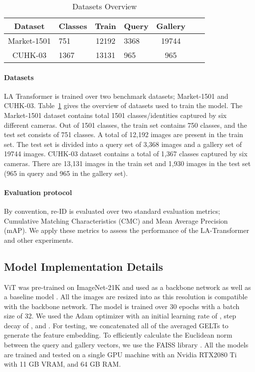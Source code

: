 \documentclass{article}
\begin{document}
\begin{table} 
  \label{DatasetOverview}
    \caption{Datasets Overview}
  \centering
  \begin{tabular}{clclclc}
    \toprule
Dataset     & Classes     & Train     & Query     & Gallery \\
    \midrule
    Market-1501 & 751       & 12192      & 3368      & 19744 \\
    CUHK-03     & 1367      & 13131     & 965       & 965  \\
    \bottomrule
  \end{tabular}
\end{table}

\paragraph{Datasets} LA Transformer is trained over two benchmark datasets; Market-1501 and CUHK-03. Table~\ref{DatasetOverview} gives the overview of datasets used to train the model. The Market-1501 dataset \citep{Market1501} contains total 1501 classes/identities captured by six different cameras.  Out of 1501 classes, the train set contains 750 classes, and the test set consists of 751 classes. A total of 12,192 images are present in the train set. The test set is divided into a query set of 3,368 images and a gallery set of 19744 images. CUHK-03 dataset \citep{cuhk03} contains a total of 1,367 classes captured by six cameras. There are 13,131 images in the train set and 1,930 images in the test set (965 in query and 965 in the gallery set).

\paragraph{Evaluation protocol} By convention, re-ID is evaluated over two standard evaluation metrics; Cumulative Matching Characteristics (CMC) and Mean Average Precision (mAP). We apply these metrics to assess the performance of the LA-Transformer and other experiments. 

\subsection{Model Implementation Details} \label{ModelImplementation}

ViT was pre-trained on ImageNet-21K and used as a backbone network as well as a baseline model \citep{ViT, imagenet21k}. All the images are resized into  as this resolution is compatible with the backbone network.  The model is trained over 30 epochs with a batch size of 32. We used the Adam optimizer with an initial learning rate of , step decay of ,   and . For testing, we concatenated all of the averaged GELTs  to generate the feature embedding. To efficiently calculate the Euclidean norm between the query and gallery vectors, we use the FAISS library \citet{FAISS}. All the models are trained and tested on a single GPU machine with an Nvidia RTX2080 Ti with 11 GB VRAM, and 64 GB RAM.
\end{document}
